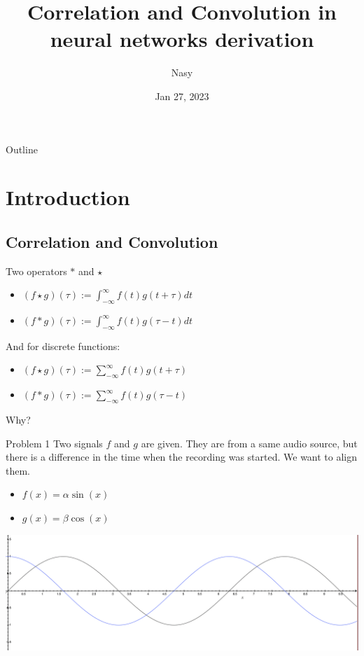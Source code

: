 \documentclass[aspectratio=1610,xcolor={dvipsnames},hyperref={colorlinks,unicode,linkcolor=violet,anchorcolor=BlueViolet,citecolor=YellowOrange,filecolor=black,urlcolor=Aquamarine}]{beamer}
\author{Nasy}
\date{Jan 27, 2023}
\title{Correlation and Convolution in neural networks derivation}
\begin{document}
\maketitle
\begin{frame}{Outline}
\tableofcontents
\end{frame}


\section{Introduction}
\label{sec:org8cccbd1}

\subsection{Correlation and Convolution}
\label{sec:org5b399ff}

\begin{frame}[label={sec:org2761aff}]{Two operators \(\ast\) and \(\star\)}
\begin{itemize}
\item \((f\star g)(\tau ) := \int _{-\infty }^{\infty }f(t)g(t+\tau )dt\)
\item \((f*g)(\tau) := \int _{-\infty }^{\infty }f(t)g(\tau-t )dt\)
\end{itemize}

And for discrete functions:

\begin{itemize}
\item \((f\star g)(\tau ) := \sum _{-\infty }^{\infty }f(t)g(t+\tau )\)
\item \((f*g)(\tau) := \sum _{-\infty }^{\infty }f(t)g(\tau-t )\)
\end{itemize}

\alert{Why?}
\end{frame}

\begin{frame}[label={sec:orgb2021dc}]{Problem 1}
Two signals \(f\) and \(g\) are given.  They are from a same audio source, but there is a difference in the time when the recording was started.
We want to align them.

\begin{itemize}
\item \(f(x) = \alpha \sin(x)\)
\item \(g(x) = \beta \cos(x)\)
\end{itemize}

\begin{center}
\includegraphics[width=.9\linewidth]{./p1.png}
\end{center}
\end{frame}
\end{document}
